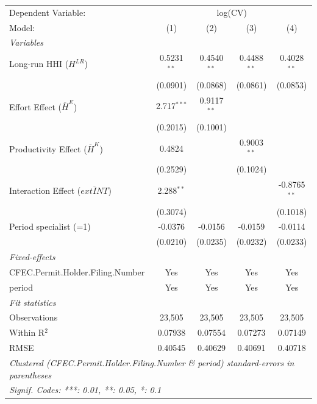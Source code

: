 
\begingroup
\centering
\begin{tabular}{lcccc}
   \tabularnewline \midrule \midrule
   Dependent Variable: & \multicolumn{4}{c}{log(CV)}\\
   Model:                                        & (1)           & (2)           & (3)           & (4)\\  
   \midrule
   \emph{Variables}\\
   Long-run HHI ($H^{LR}$)                       & 0.5231$^{**}$ & 0.4540$^{**}$ & 0.4488$^{**}$ & 0.4028$^{**}$\\   
                                                 & (0.0901)      & (0.0868)      & (0.0861)      & (0.0853)\\   
   Effort Effect ($\overline{H}^E$)              & 2.717$^{***}$ & 0.9117$^{**}$ &               &   \\   
                                                 & (0.2015)      & (0.1001)      &               &   \\   
   Productivity Effect ($\overline{H}^K$)        & 0.4824        &               & 0.9003$^{**}$ &   \\   
                                                 & (0.2529)      &               & (0.1024)      &   \\   
   Interaction Effect ($\overline{	ext{INT}}$)  & 2.288$^{**}$  &               &               & -0.8765$^{**}$\\   
                                                 & (0.3074)      &               &               & (0.1018)\\   
   Period specialist (=1)                        & -0.0376       & -0.0156       & -0.0159       & -0.0114\\   
                                                 & (0.0210)      & (0.0235)      & (0.0232)      & (0.0233)\\   
   \midrule
   \emph{Fixed-effects}\\
   CFEC.Permit.Holder.Filing.Number              & Yes           & Yes           & Yes           & Yes\\  
   period                                        & Yes           & Yes           & Yes           & Yes\\  
   \midrule
   \emph{Fit statistics}\\
   Observations                                  & 23,505        & 23,505        & 23,505        & 23,505\\  
   Within R$^2$                                  & 0.07938       & 0.07554       & 0.07273       & 0.07149\\  
   RMSE                                          & 0.40545       & 0.40629       & 0.40691       & 0.40718\\  
   \midrule \midrule
   \multicolumn{5}{l}{\emph{Clustered (CFEC.Permit.Holder.Filing.Number \& period) standard-errors in parentheses}}\\
   \multicolumn{5}{l}{\emph{Signif. Codes: ***: 0.01, **: 0.05, *: 0.1}}\\
\end{tabular}
\par\endgroup


